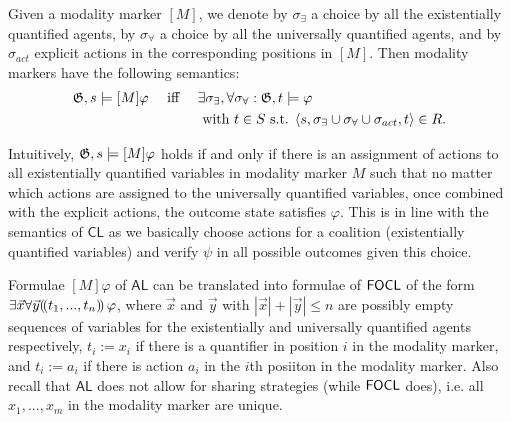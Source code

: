 \documentclass{article}
\begin{document}
Given a modality marker $[M]$, we denote by $\sigma_\exists$ a choice by all the existentially quantified agents, by $\sigma_\forall$ a choice by all the universally quantified agents, and by $\sigma_{act}$ explicit actions in the corresponding positions in $[M]$. Then modality markers have the following semantics:
  \begin{alignat*}{3}
        &\mathfrak{G},s \models [M] \varphi && \text{ iff } && \exists \sigma_\exists, \forall \sigma_\forall : \mathfrak{G},t \models \varphi \\
        & && &&\text{ with } t \in S \text{ s.t. } \langle s, \sigma_\exists \cup \sigma_\forall \cup \sigma_{act}, t \rangle \in R.   
\end{alignat*}   
\iffalse
\begin{gather*}
    \G,s \models [M] \varphi \text{ iff }\\
    \text{ for all } x_1, ...., x_m \text{ with } \exists x_i \in M, \exists a_i \in \Ac \text{ s.t. } \\
        \langle s, A, s'\rangle \in R \text{ and } \G,s'\models \varphi, \text{ for all } A \text{ s.t. } a_1, ..., a_m \sqsubseteq A.  
\end{gather*}
\fi
\iffalse
  \begin{alignat*}{3}
        &\G,s \models [M] \varphi && \text{ iff } && \text{ for all } x_1, ...., x_m \text{ with } \exists x_i \in M, \exists a_i \in \Ac \text{ s.t. }\\
        & && &&\langle s, A, s'\rangle \in R \text{ and } \G,s'\models \varphi,\\ & && &&\text{ for all } A \text{ s.t. } a_1, ..., a_m \sqsubseteq A.  
\end{alignat*}    
\fi
Intuitively, $\mathfrak{G},s \models [M] \varphi$ holds if and only if there is an assignment of actions to all existentially quantified variables in modality marker $M$ such that no matter which actions are assigned to the universally quantified variables, once combined with the explicit actions, the outcome state satisfies $\varphi$. This is in line with the semantics of $\mathsf{CL}$ as we basically choose actions for a coalition (existentially quantified variables) and verify $\psi$ in all possible outcomes given this choice. 

Formulae $[M]\varphi$ of $\mathsf{AL}$ can be translated into formulae of $\mathsf{FOCL}$ of the form $\exists \vec x \forall \vec y (\!( t_1, ..., t_n )\!)\, \varphi$, where $\vec x$ and $\vec y$ with $|\vec x| + |\vec y| \leqslant n$ are possibly empty sequences of variables for the existentially and universally quantified agents respectively, $t_i := x_i$ if there is a quantifier in position $i$ in the modality marker, and $t_i:= a_i$ if there is action $a_i$ in the $i$th posiiton in the modality marker. Also recall that $\mathsf{AL}$ does not allow for sharing strategies (while $\mathsf{FOCL}$ does), i.e. all $x_1, ..., x_m$ in the modality marker are unique. 
\end{document}
